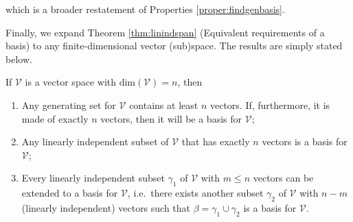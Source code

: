 which is a broader restatement of Properties \ref{proper:findgenbasis}.

Finally, we expand Theorem \ref{thm:linindspan} (Equivalent requirements of a basis) to any finite-dimensional vector (sub)space. The results are simply stated below.
\begin{proper}
\label{proper:linindspanbasisnewver}
If $\mathcal{V}$ is a vector space with $\text{dim}(\mathcal{V}) = n$, then
\begin{enumerate}[label=(\alph*)]
    \item Any generating set for $\mathcal{V}$ contains at least $n$ vectors. If, furthermore, it is made of exactly $n$ vectors, then it will be a basis for $\mathcal{V}$;
    \item Any linearly independent subset of $\mathcal{V}$ that has exactly $n$ vectors is a basis for $\mathcal{V}$;
    \item Every linearly independent subset $\mathcal{\gamma}_1$ of $\mathcal{V}$ with $m \leq n$ vectors can be extended to a basis for $\mathcal{V}$, i.e.\ there exists another subset $\mathcal{\gamma}_2$ of $\mathcal{V}$ with $n-m$ (linearly independent) vectors such that $\mathcal{\beta} = \mathcal{\gamma}_1 \cup \mathcal{\gamma}_2$ is a basis for $\mathcal{V}$.
\end{enumerate}
\end{proper}
